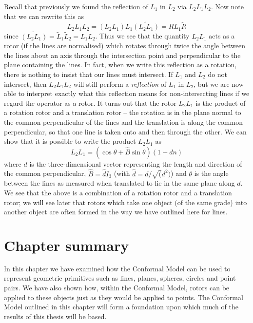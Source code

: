 Recall that
previously we found the reflection of $L_1$ in $L_2$ via
$L_2L_1L_2$. Now note that we can rewrite this as
%
\begin{equation}
 L_2L_1L_2 = (L_2L_1)L_1\widetilde{(L_2L_1)} = RL_1\tilde{R}
\end{equation}
%
since $\widetilde{(L_2L_1)} = \tilde{L}_1\tilde{L}_2=L_1L_2$.
Thus we see that the quantity $L_2L_1$ acts as a rotor
(if the lines are normalised) which rotates through twice
the angle between the lines about an axis through the
intersection point and perpendicular to the plane
containing the lines. In fact, when we write this
reflection as a rotation, there is nothing to insist that
our lines must intersect. If $L_1$ and $L_2$ do not
intersect, then $L_2L_1L_2$ will still perform a {\em
reflection} of $L_1$ in $L_2$, but we are now able to
interpret exactly what this reflection means for
non-intersecting lines if we regard the operator as a
rotor. It turns out that the rotor $L_2L_1$ is the
product of a rotation rotor and a translation rotor --
the rotation is in the plane normal to the common
perpendicular of the lines and the translation is along
the common perpendicular, so that one line is taken onto
and then through the other. We can show that it is
possible to write the product $L_2L_1$ as
%
\begin{equation}
L_2L_1 = (\cos{\theta} + \hat{B}\sin{\theta})(1 + dn)
\end{equation}
%
where $d$ is the three-dimensional vector representing the length and
direction of the common perpendicular, $\hat{B} =
\hat{d}I_3$ (with $\hat{d}=d/\sqrt(d^2)$) and  $\theta$
is the angle between the lines as measured when
translated to lie in the same plane along $d$. We see
that the above is a combination of a rotation rotor and a
translation rotor; we will see later that rotors which
take one object (of the same grade) into another object
are often formed in the way we have outlined here for
lines.

\section{Chapter summary}

In this chapter we have examined how the Conformal Model can be used to
represent geometric primitives such as lines, planes, spheres, circles and point
pairs. We have also shown how, within the Conformal Model, rotors can
be applied to these objects just as they would be applied to points. 
The Conformal Model outlined in this chapter will form a foundation upon which much
of the results of this thesis will be based.

